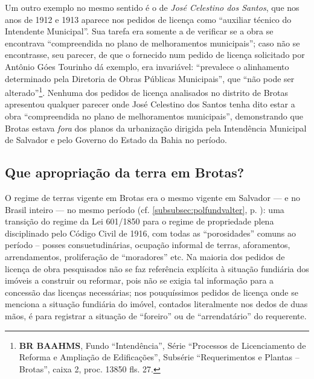 Um outro exemplo no mesmo sentido é o de \textit{José Celestino dos Santos}, que nos anos de 1912 e 1913 aparece nos pedidos de licença como ``auxiliar técnico do Intendente Municipal''. Sua tarefa era somente a de verificar se a obra se encontrava ``compreendida no plano de melhoramentos municipais''; caso não se encontrasse, seu parecer, de que o fornecido num pedido de licença solicitado por Antônio Góes Tourinho dá exemplo, era invariável: ``prevalece o  alinhamento determinado pela Diretoria de Obras Públicas Municipais'', que ``não pode ser alterado''\footnote{\textbf{BR BAAHMS}, Fundo ``Intendência'', Série ``Processos de Licenciamento de Reforma e Ampliação de Edificações'', Subsérie ``Requerimentos e Plantas – Brotas'', caixa 2, proc. 13850 fls. 27.}. Nenhuma dos pedidos de licença analisados no distrito de Brotas apresentou qualquer parecer onde José Celestino dos Santos tenha dito estar a obra ``compreendida no plano de melhoramentos municipais'', demonstrando que Brotas estava \textit{fora} dos planos da urbanização dirigida pela Intendência Municipal de Salvador e pelo Governo do Estado da Bahia no período.

\subsection{Que apropriação da terra em Brotas?}\label{subsec:apropribrotas}

O regime de terras vigente em Brotas era o mesmo vigente em Salvador --- e no Brasil inteiro --- no mesmo período (cf. \autoref{subsubsec:polfundvalter}, p. \pageref{subsubsec:polfundvalter}): uma transição do regime da Lei 601/1850 para o regime de propriedade plena disciplinado pelo Código Civil de 1916, com todas as ``porosidades'' comuns ao período -- posses consuetudinárias, ocupação informal de terras, aforamentos, arrendamentos, proliferação de ``moradores'' etc. Na maioria dos pedidos de licença de obra pesquisados não se faz referência explícita à situação fundiária dos imóveis a construir ou reformar, pois não se exigia tal informação para a concessão das licenças necessárias; nos pouquíssimos pedidos de licença onde se menciona a situação fundiária do imóvel, contados literalmente nos dedos de duas mãos, é para registrar a situação de ``foreiro'' ou de ``arrendatário'' do requerente. 

